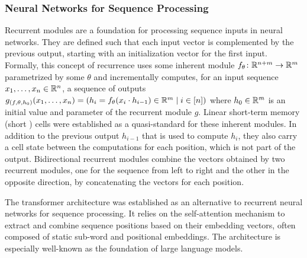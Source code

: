 \documentclass[../document.tex]{subfiles}
\begin{document}
    \subsubsection{Neural Networks for Sequence Processing}\label{sec:preliminaries:nn:recurrent}
    Recurrent modules are a foundation for processing sequence inputs in neural networks.
    They are defined such that each input vector is complemented by the previous output, starting with an initialization vector for the first input.
    Formally, this concept of recurrence uses some inherent module \(f_\theta\colon \mathbb{R}^{n+m} \to \mathbb{R}^m\) parametrized by some \(\theta\) and incrementally computes, for an input sequence \(x_1, \ldots, x_n \in \mathbb{R}^n\), a sequence of outputs \(g_{(f, \theta, h_0)}(x_1, \ldots, x_n) = (h_i = f_\theta(x_i \cdot h_{i-1}) \in \mathbb{R}^m \mid i \in [n])\) where \(h_0 \in \mathbb{R}^m\) is an initial value and parameter of the recurrent module \(g\).
    Linear short-term memory (short ) cells \citep{Hoc97} were established as a quasi-standard for these inherent modules.
    In addition to the previous output \(h_{i-1}\) that is used to compute \(h_i\), they also carry a cell state between the computations for each position, which is not part of the output.
    Bidirectional recurrent modules combine the vectors obtained by two recurrent modules, one for the sequence from left to right and the other in the opposite direction, by concatenating the vectors for each position.

    The transformer architecture \citep{vaswani2017attention} was established as an alternative to recurrent neural networks for sequence processing.
    It relies on the self-attention mechanism to extract and combine sequence positions based on their embedding vectors, often composed of static sub-word and positional embeddings.
    The architecture is especially well-known as the foundation of large language models.
\end{document}

